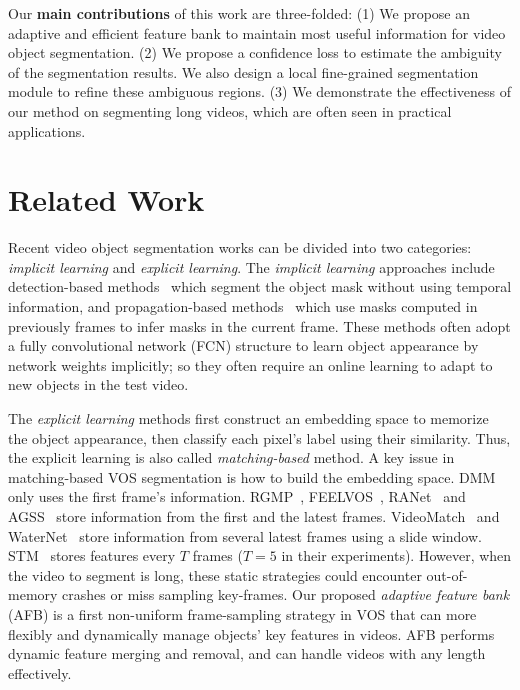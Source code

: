 \documentclass{article}
\begin{document}
Our \textbf{main contributions} of this work are three-folded:  
(1) We propose an adaptive and efficient feature bank to maintain most useful information for video object segmentation.
(2) We propose a confidence loss to estimate the ambiguity of the segmentation results. We also design a local fine-grained segmentation module to refine these ambiguous regions.
(3) We demonstrate the effectiveness of our method on segmenting long videos, which are often seen in practical applications.


\section{Related Work}

Recent video object segmentation works can be divided into two categories: \emph{implicit learning} and \emph{explicit learning}. 
The \emph{implicit learning} approaches include detection-based methods~\cite{caelles2017one, maninis_video_2019} which segment the object mask without using temporal information, and propagation-based methods~\cite{Perazzi2017, hu_maskrnn_2017, voigtlaender17BMVC, bao_cnn_2018, LucidDataDreaming_CVPR17_workshops, hu_motion-guided_2018} which use masks computed in previously frames to infer masks in the current frame. 
These methods often adopt a fully convolutional network (FCN) structure to learn object appearance by network weights implicitly; so they often require an online learning to adapt to new objects in the test video.

The \emph{explicit learning} methods first construct an embedding space to memorize the object appearance, then classify each pixel's label using their similarity. 
Thus, the explicit learning is also called \emph{matching-based} method.
A key issue in matching-based VOS segmentation is how to build the embedding space. 
DMM~\cite{zeng_dmm-net_2019} only uses the first frame's information.
RGMP~\cite{oh_fast_2018}, FEELVOS~\cite{voigtlaender2019feelvos}, RANet~\cite{wang_ranet_2019} and AGSS~\cite{lin_agss-vos_2019} store information from the first and the latest frames. 
VideoMatch~\cite{hu2018videomatch} and WaterNet~\cite{liang2020waternet} store information from several latest frames using a slide window.
STM~\cite{oh_video_2019} stores features every $T$ frames ($T=5$ in their experiments). 
However, when the video to segment is long,  these static strategies could encounter out-of-memory crashes or miss sampling key-frames. 
Our proposed \emph{adaptive feature bank} (AFB) is a first non-uniform frame-sampling strategy in VOS that can more flexibly and dynamically manage objects' key features in videos. 
AFB performs dynamic feature merging and removal, and can handle videos with any length effectively.
\end{document}
